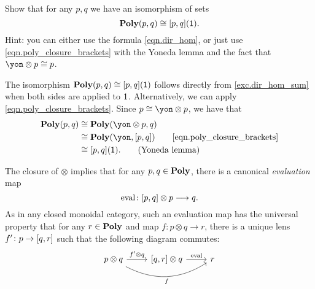 \documentclass[Book-Poly]{subfiles}
\begin{document}
\begin{exercise}\label{exc.poly_plug_1}
Show that for any $p,q$ we have an isomorphism of sets
\[
\mathbf{Poly}(p,q) \cong [p,q](\textsf{1}).
\]
Hint: you can either use the formula \eqref{eqn.dir_hom}, or just use 
\eqref{eqn.poly_closure_brackets} with the Yoneda lemma and the fact that $\yon\otimes p \iso p$.
\begin{solution}
The isomorphism $\mathbf{Poly}(p,q) \cong [p,q](\textsf{1})$ follows directly from \cref{exc.dir_hom_sum} when both sides are applied to $\textsf{1}$.
Alternatively, we can apply \eqref{eqn.poly_closure_brackets}.
Since $p \iso \yon \otimes p$, we have that
\begin{align*}
    \poly(p, q) &\iso \poly(\yon \otimes p, q) \\
    &\iso \poly(\yon, \ihom{p,q}) \tag*{\eqref{eqn.poly_closure_brackets}} \\
    &\iso \ihom{p,q}(\1). \tag{Yoneda lemma}
\end{align*}
\end{solution}
\end{exercise}

The closure of $\otimes$ implies that for any $p,q\in\mathbf{Poly}$, there is a canonical \emph{evaluation} map
\begin{equation}\label{eqn.eval_dirichlet}
  \mathrm{eval}\colon [p,q]\otimes p\longrightarrow q.
\end{equation}
As in any closed monoidal category, such an evaluation map has the universal property that for any $r\in\mathbf{Poly}$ and map $f\colon p\otimes q\to r$, there is a unique lens $f'\colon p\to[q,r]$ such that the following diagram commutes:
\[
    \begin{tikzcd}
    	p\otimes q\ar[r, "f'\otimes q"]\ar[rr, bend right, "f"']&
    	{\ihom{q,r}}\otimes q\ar[r, "\fun{eval}"]&
    	r
    \end{tikzcd}
\]
\end{document}
